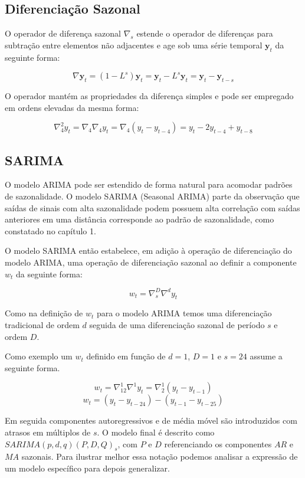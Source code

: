\subsection{Diferenciação Sazonal}

O operador de diferença sazonal $\nabla_s$ estende o operador de diferenças
para subtração entre elementos não adjacentes e age sob uma série temporal
$\mathbf{y}_t$ da seguinte forma:

$$ \nabla \mathbf{y}_t = (1 - L^s)\mathbf{y}_t = \mathbf{y}_t - L^s\mathbf{y}_t = \mathbf{y}_t - \mathbf{y}_{t-s} $$

O operador mantém as propriedades da diferença simples e pode ser empregado em
ordens elevadas da mesma forma:

$$\nabla_4^2 y_t = \nabla_4 \nabla_4 y_t = \nabla_4 (y_t - y_{t-4}) = y_t - 2y_{t-4} + y_{t-8} $$

\subsection{SARIMA}\label{ssec:SARIMA}

O modelo ARIMA pode ser estendido de forma natural para acomodar padrões de
sazonalidade. O modelo SARIMA (Seasonal ARIMA) parte da observação que saídas
de sinais com alta sazonalidade podem possuem alta correlação com saídas
anteriores em uma distância corresponde ao padrão de sazonalidade, como
constatado no capítulo 1.

O modelo SARIMA então estabelece, em adição à operação de diferenciação do
modelo ARIMA, uma operação de diferenciação sazonal ao definir a componente
$w_t$ da seguinte forma:

$$ w_t = \nabla^D_{s}\nabla^d  y_t $$

Como na definição de $w_t$ para o modelo ARIMA temos uma diferenciação
tradicional de ordem $d$ seguida de uma diferenciação sazonal de período $s$
e ordem $D$.

Como exemplo um $w_t$ definido em função de $d=1$, $D=1$ e $s=24$ assume a
seguinte forma.

$$ w_t =  \nabla^1_{12} \nabla^1 y_t = \nabla^1_{2} (y_t - y_{t-1}) $$
$$ w_t =  (y_t - y_{t-24}) - (y_{t-1} - y_{t-25}) $$

Em seguida componentes autoregressivos e de média móvel são introduzidos com
atrasos em múltiplos de $s$. O modelo final é descrito como $SARIMA(p, d, q)
(P, D, Q)_{s}$, com $P$ e $D$ referenciando os componentes $AR$ e $MA$
sazonais. Para ilustrar melhor essa notação podemos analisar a expressão de um
modelo específico para depois generalizar.

